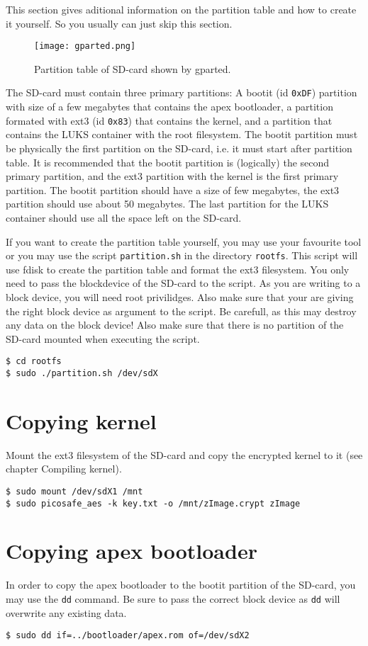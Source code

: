 This section gives aditional information on the partition table and how to
create it yourself. So you usually can just skip this section.

\begin{wrapfigure}{r}{0.5\textwidth}
  \begin{center}
    \texttt{[image: gparted.png]}
  \end{center}
  \caption{Partition table of SD-card shown by gparted.}
\end{wrapfigure}

The SD-card must contain three primary partitions: A bootit (id \texttt{0xDF})
partition with size of a few megabytes that contains the apex bootloader, a
partition formated with ext3 (id \texttt{0x83}) that contains the kernel, and a
partition that contains the LUKS container with the root filesystem. The
bootit partition must be physically the first partition on the SD-card, i.e.
it must start after partition table. It is recommended that the bootit
partition is (logically) the second primary partition, and the ext3 partition
with the kernel is the first primary partition. The bootit partition should
have a size of few megabytes, the ext3 partition should use about 50 megabytes.
The last partition for the LUKS container should use all the space left on the
SD-card.

If you want to create the partition table yourself, you may use your favourite
tool or you may use the script \texttt{partition.sh} in the directory
\texttt{rootfs}. This script will use fdisk to create the partition table and
format the ext3 filesystem. You only need to pass the blockdevice of the
SD-card to the script. As you are writing to a block device, you will need root
privilidges. Also make sure that your are giving the right block device as
argument to the script. Be carefull, as this may destroy any data on the block
device! Also make sure that there is no partition of the SD-card mounted when
executing the script.

\texttt{\$ cd rootfs} \\
\texttt{\$ sudo ./partition.sh /dev/sdX}

\section{Copying kernel}

Mount the ext3 filesystem of the SD-card and copy the encrypted kernel to it
(see chapter Compiling kernel).

\texttt{\$ sudo mount /dev/sdX1 /mnt} \\
\texttt{\$ sudo picosafe\_aes -k key.txt -o /mnt/zImage.crypt zImage}

\section{Copying apex bootloader}

In order to copy the apex bootloader to the bootit partition of the SD-card, you
may use the \texttt{dd} command. Be sure to pass the correct block device as
\texttt{dd} will overwrite any existing data.

\texttt{\$ sudo dd if=../bootloader/apex.rom of=/dev/sdX2}

